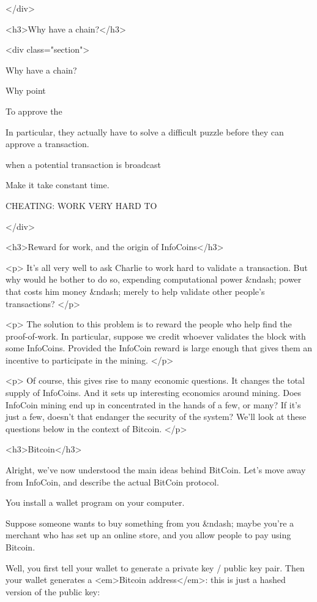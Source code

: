 </div>

<h3>Why have a chain?</h3>

<div class="section">

Why have a chain?


Why point 

To approve the 

In particular, they actually have to solve a difficult puzzle before
they can approve a transaction.



when a potential transaction is broadcast



Make it take constant time.


CHEATING: WORK VERY HARD TO 

</div>

<h3>Reward for work, and the origin of InfoCoins</h3>

<p>
It's all very well to ask Charlie to work hard to validate a
transaction.  But why would he bother to do so, expending
computational power &ndash; power that costs him money &ndash; merely to help
validate other people's transactions?
</p>

<p>
The solution to this problem is to reward the people who help find the
proof-of-work.  In particular, suppose we credit whoever validates the
block with some InfoCoins.  Provided the InfoCoin reward is large
enough that gives them an incentive to participate in the mining.
</p>

<p>
Of course, this gives rise to many economic questions.  It changes the
total supply of InfoCoins.  And it sets up interesting economics
around mining.  Does InfoCoin mining end up in concentrated in the
hands of a few, or many?  If it's just a few, doesn't that endanger
the security of the system?  We'll look at these questions below in
the context of Bitcoin.
</p>

<h3>Bitcoin</h3>

Alright, we've now understood the main ideas behind BitCoin.  Let's
move away from InfoCoin, and describe the actual BitCoin protocol.

You install a wallet program on your computer.

Suppose someone wants to buy something from you &ndash; maybe you're a
merchant who has set up an online store, and you allow people to pay
using Bitcoin.

Well, you first tell your wallet to generate a private key / public
key pair.  Then your wallet generates a <em>Bitcoin address</em>: this
is just a hashed version of the public key:

